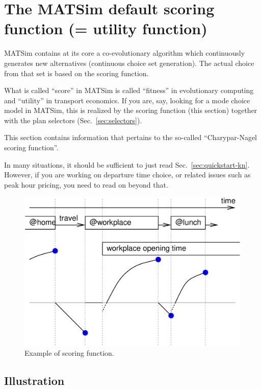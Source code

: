 \chapter{The MATSim default scoring function (= utility function)}


\def\betaperf{\beta_{\it perf}}

\begin{chapter-intro}
MATSim contains at its core a co-evolutionary algorithm which continuously generates new alternatives (continuous choice set generation).  The actual choice from that set is based on the scoring function.
\end{chapter-intro}

\begin{note}
What is called ``score'' in MATSim is called ``fitness'' in evolutionary computing and ``utility'' in transport economics.  If you are, say, looking for a mode choice model in MATSim, this is realized by the scoring function (this section) together with the plan selectors (Sec.~\ref{sec:selectors}).
\end{note}

This section contains information that pertains to the so-called ``Charypar-Nagel scoring function''.

In many situations, it should be sufficient to just read Sec.~\ref{sec:quickstart-kn}.  However, if you are working on departure time choice, or related issues such as peak hour pricing, you need to read on beyond that.

\umbruch

\begin{figure}[h]
\centerline{%
\includegraphics[width=0.6\hsize]{figures/scoringFunction/scoring-example-wo-marginal}
}
\caption{Example of scoring function.}
\label{fig:scoring-example-wo-marginal}
\end{figure}

\section{Illustration}

